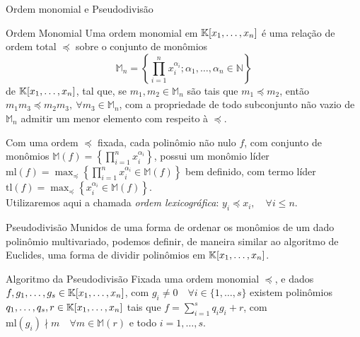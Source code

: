\begin{frame}[t]{Ordem monomial e Pseudodivisão}
\small

    \begin{defbox}{Ordem Monomial}
Uma ordem monomial em $\mathbb{K}[x_1,\ldots, x_n]$ é uma relação de ordem total $\preceq$ sobre o conjunto de monômios \[\mathbb{M}_n = \left\{\prod_{i=1}^nx_i^{\alpha_i} ; \alpha_1, \dots, \alpha_n \in \mathbb{N}\right\}\] de $\mathbb{K}[x_1,\ldots, x_n]$, tal que, se $m_1,m_2 \in \mathbb{M}_n$ são tais que $m_1 \preceq m_2$, então $m_1m_3 \preceq m_2m_3, ~ \forall  m_3 \in \mathbb{M}_n$, com a propriedade de todo subconjunto não vazio de $\mathbb{M}_n$ admitir um menor elemento com respeito à $\preceq$.
    \end{defbox}
\pause
Com uma ordem $\preceq$ fixada, cada polinômio não nulo $f$, com conjunto de monômios $\displaystyle  \mathbb{M}(f)=\left\{\prod_{i=1}^nx_i^{\alpha_i}\right\}$, possui um monômio líder $\displaystyle  \mathrm{ml}(f)=\max_\preceq\left\{\prod_{i=1}^nx_i^{\alpha_i}\in\mathbb{M}(f)\right\}$ bem definido, com termo líder $\displaystyle\mathrm{tl}(f) = \max_\preceq \left\{x_i^{\alpha_i} \in \mathbb{M}(f)\right\}$. \\
\vspace{0.4cm}
Utilizaremos aqui a chamada \textit{ordem lexicográfica}: $y_i \preceq x_i, \quad \forall i \leq n$.
\end{frame}

    \begin{frame}[t]{Pseudodivisão}
    \vspace{0.6cm}
    Munidos de uma forma de ordenar os monômios de um dado polinômio multivariado, podemos definir, de maneira similar ao algoritmo de Euclides, uma forma de dividir polinômios em $\mathbb{K}[x_1,\dots,x_n]$.
    \vspace{0.8cm}
    \pause
    \begin{teobox}{Algoritmo da Pseudodivisão}
        Fixada uma ordem monomial $\preceq$, e dados $f,g_1,\dots,g_s \in \mathbb{K}[x_1,\dots,x_n]$, com $g_i \neq 0 \quad \forall i\in\{1,\dots,s\}$ existem polinômios $q_1,\dots,q_s,r \in \mathbb{K}[x_1,\dots,x_n]$ tais que $\displaystyle f = \sum_{i=1}^sq_ig_i +r$, com $\mathrm{ml}(g_i) \nmid m \quad \forall m\in \mathbb{M}(r)$ e todo $i = 1,\dots,s.$ 
    \end{teobox}
\end{frame}